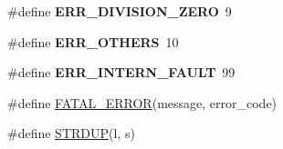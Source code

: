 \begin{DoxyCompactItemize}
\item 
\hypertarget{group__expression__processing_ga7226d4889da856a935d6749b45778022}{}\#define {\bfseries E\+R\+R\+\_\+\+D\+I\+V\+I\+S\+I\+O\+N\+\_\+\+Z\+E\+R\+O}~9\label{group__expression__processing_ga7226d4889da856a935d6749b45778022}

\item 
\hypertarget{group__expression__processing_ga18dd2f4dc443436ec22915d1a2ff1667}{}\#define {\bfseries E\+R\+R\+\_\+\+O\+T\+H\+E\+R\+S}~10\label{group__expression__processing_ga18dd2f4dc443436ec22915d1a2ff1667}

\item 
\hypertarget{group__expression__processing_ga81c0b2aff83c4ff667ff4fe7bb17fe26}{}\#define {\bfseries E\+R\+R\+\_\+\+I\+N\+T\+E\+R\+N\+\_\+\+F\+A\+U\+L\+T}~99\label{group__expression__processing_ga81c0b2aff83c4ff667ff4fe7bb17fe26}

\item 
\#define \hyperlink{group__expression__processing_gad00ce6a1d92b76fec757cc05ca401c20}{F\+A\+T\+A\+L\+\_\+\+E\+R\+R\+O\+R}(message,  error\+\_\+code)
\item 
\#define \hyperlink{group__expression__processing_gaefbe6596bcbb11c624652e80c37ec88a}{S\+T\+R\+D\+U\+P}(l,  s)
\end{DoxyCompactItemize}
